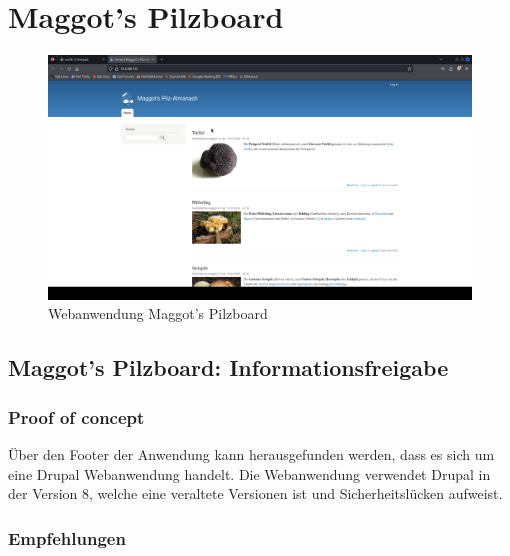 \pagebreak
\chapter{Maggot's Pilzboard}

\begin{figure}[!ht]
    \centering
    \includegraphics[width=\linewidth]{images/screenshots/07_pilzboard.png}
    \caption{Webanwendung Maggot's Pilzboard}
    \label{fig:05_pilzboard}
\end{figure}
\newpage


\section{\makecvssbadge Maggot's Pilzboard: Informationsfreigabe}

\subsection*{Proof of concept}
Über den Footer der Anwendung kann herausgefunden werden, dass es sich um eine Drupal Webanwendung handelt. Die Webanwendung verwendet Drupal in der Version 8, welche eine veraltete Versionen ist und Sicherheitslücken aufweist.

\subsection*{Empfehlungen}

